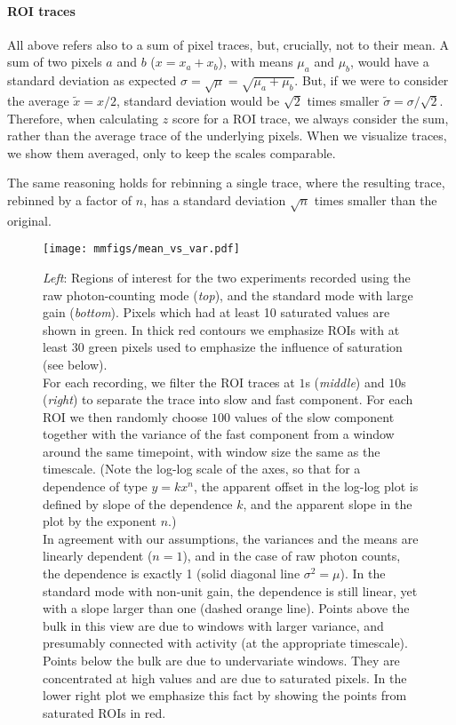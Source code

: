 \documentclass[a4paper,11pt,oneside,]{article}
\begin{document}
\paragraph{ROI traces}
All above refers also to a sum of pixel traces, but, crucially, not to their mean. A sum of two pixels $a$ and $b$ ($x=x_a+x_b$), with means $\mu_a$ and $\mu_b$, would have a standard deviation as expected $\sigma = \sqrt{\mu} = \sqrt{\mu_a+\mu_b}$. But, if we were to consider the average $\tilde x = x/2$, standard deviation would be $\sqrt{2}$ times smaller $\tilde \sigma = \sigma/\sqrt{2}$.
Therefore, when calculating $z$ score for a ROI trace, we always consider the sum, rather than the average trace of the underlying pixels. When we visualize traces, we show them averaged, only to keep the scales comparable.

The same reasoning holds for rebinning a single trace, where the resulting trace, rebinned by a factor of $n$,  has a standard deviation $\sqrt{n}$ times smaller than the original.


\begin{figure}[t]
 \centering
 \texttt{[image: mmfigs/mean\_vs\_var.pdf]}
 \caption{
 {\it Left}: Regions of interest for the two experiments recorded using the raw photon-counting mode ({\it top}), and the standard mode with large gain ({\it bottom}). Pixels which had at least 10 saturated values are shown in green. In thick red contours we emphasize ROIs with at least 30 green pixels used to emphasize the influence of saturation (see below).
 \\
 For each recording, we filter the ROI traces at $1$s ({\it middle}) and $10$s ({\it right}) to separate the trace into slow and fast component. For each ROI we then randomly choose $100$ values of the slow component together with the variance of the fast component from a window around the same timepoint, with window size the same as the timescale. 
 (Note the log-log scale of the axes, so that for a dependence of type $y=kx^n$, the apparent offset in the log-log plot is defined by slope of the dependence $k$, and the apparent slope in the plot by the exponent $n$.)
 \\
In agreement with our assumptions, the variances and the means are linearly dependent ($n=1$), and in the case of raw photon counts, the dependence is exactly 1 (solid diagonal line $\sigma^2=\mu$). In the standard mode with non-unit gain, the dependence is still linear, yet with a slope larger than one (dashed orange line). Points above the bulk in this view are due to windows with larger variance, and presumably connected with activity (at the appropriate timescale). Points below the bulk are due to undervariate windows. They are concentrated at high values and are due to saturated pixels. In the lower right plot we emphasize this fact by showing the points from saturated ROIs in red.
 }
 \label{fig:mean_vs_var}
\end{figure}
\end{document}

